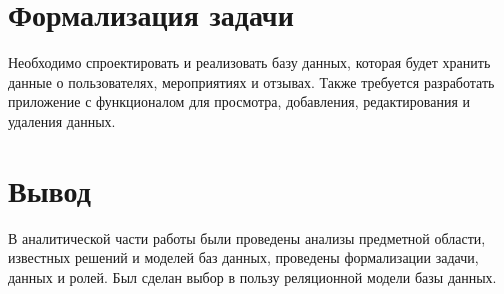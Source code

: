 \section{Формализация задачи}

Необходимо спроектировать и реализовать базу данных, которая будет хранить данные о пользователях, мероприятиях и отзывах. Также требуется разработать приложение с функционалом для просмотра, добавления, редактирования и удаления данных.

\section{Вывод}

В аналитической части работы были проведены анализы предметной области, известных решений и моделей баз данных, проведены формализации задачи, данных и ролей. Был сделан выбор в пользу реляционной модели базы данных.

\clearpage
